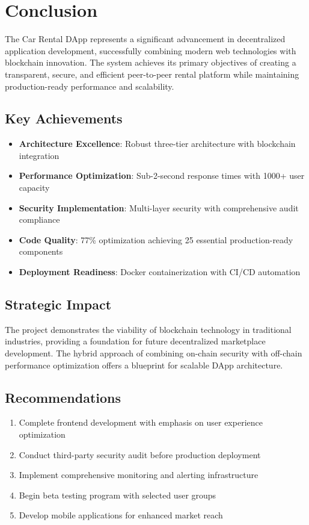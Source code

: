 \documentclass[12pt,a4paper]{article}
\begin{document}
\section{Conclusion}

The Car Rental DApp represents a significant advancement in decentralized application development, successfully combining modern web technologies with blockchain innovation. The system achieves its primary objectives of creating a transparent, secure, and efficient peer-to-peer rental platform while maintaining production-ready performance and scalability.

\subsection{Key Achievements}
\begin{itemize}
    \item \textbf{Architecture Excellence}: Robust three-tier architecture with blockchain integration
    \item \textbf{Performance Optimization}: Sub-2-second response times with 1000+ user capacity
    \item \textbf{Security Implementation}: Multi-layer security with comprehensive audit compliance
    \item \textbf{Code Quality}: 77\% optimization achieving 25 essential production-ready components
    \item \textbf{Deployment Readiness}: Docker containerization with CI/CD automation
\end{itemize}

\subsection{Strategic Impact}
The project demonstrates the viability of blockchain technology in traditional industries, providing a foundation for future decentralized marketplace development. The hybrid approach of combining on-chain security with off-chain performance optimization offers a blueprint for scalable DApp architecture.

\subsection{Recommendations}
\begin{enumerate}
    \item Complete frontend development with emphasis on user experience optimization
    \item Conduct third-party security audit before production deployment
    \item Implement comprehensive monitoring and alerting infrastructure
    \item Begin beta testing program with selected user groups
    \item Develop mobile applications for enhanced market reach
\end{enumerate}
\end{document}
